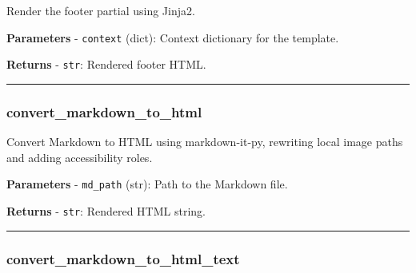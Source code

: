 \begin{Shaded}
\begin{Highlighting}[]
\NormalTok{) }\OperatorTok{{-}\textgreater{}} 
\end{Highlighting}
\end{Shaded}

Render the footer partial using Jinja2.

\textbf{Parameters} - \texttt{context} (dict): Context dictionary for
the template.

\textbf{Returns} - \texttt{str}: Rendered footer HTML.

\begin{center}\rule{0.5\linewidth}{0.5pt}\end{center}

\subsubsection{convert\_markdown\_to\_html}\label{convert_markdown_to_html}

\begin{Shaded}
\begin{Highlighting}[]
\NormalTok{) }\OperatorTok{{-}\textgreater{}} 
\end{Highlighting}
\end{Shaded}

Convert Markdown to HTML using markdown-it-py, rewriting local image
paths and adding accessibility roles.

\textbf{Parameters} - \texttt{md\_path} (str): Path to the Markdown
file.

\textbf{Returns} - \texttt{str}: Rendered HTML string.

\begin{center}\rule{0.5\linewidth}{0.5pt}\end{center}

\subsubsection{convert\_markdown\_to\_html\_text}\label{convert_markdown_to_html_text}

\begin{Shaded}
\begin{Highlighting}[]
\NormalTok{) }\OperatorTok{{-}\textgreater{}} 
\end{Highlighting}
\end{Shaded}

